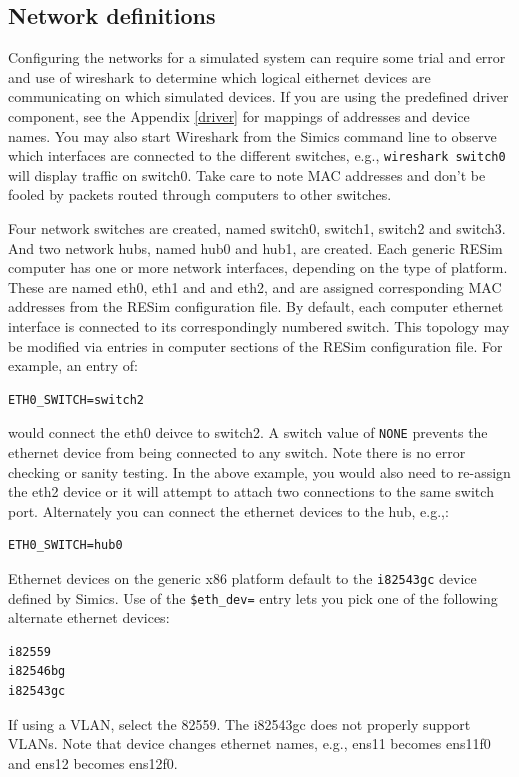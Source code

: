\documentclass[titlepage]{article}
\begin{document}
\subsection{Network definitions}
\label{networks}
Configuring the networks for a simulated system can require some trial and error and use of wireshark to determine which
logical eithernet devices are communicating on which simulated devices.  If you are using the predefined driver component, see the 
Appendix \ref{driver} for mappings of addresses and device names.  You may also start Wireshark from the Simics command line to 
observe which interfaces are connected to the different switches, e.g., {\tt wireshark switch0} will display traffic on switch0.
Take care to note MAC addresses and don't be fooled by packets routed through computers to other switches.

Four network switches are created, named switch0, switch1, switch2 and switch3. And two network hubs, named hub0 and hub1, are created.  
Each generic RESim computer has one or more network interfaces,
depending on the type of platform.
These are named eth0, eth1 and and eth2, and are assigned corresponding MAC addresses from the
RESim configuration file. By default, each computer ethernet interface is connected to its correspondingly numbered switch.
This topology may be modified via entries in computer sections of the RESim configuration file.  For example, an entry of:
\begin{verbatim}
ETH0_SWITCH=switch2
\end{verbatim}
\noindent would connect the eth0 deivce to switch2.  A switch value of {\tt NONE} prevents the ethernet device from being connected
to any switch.  Note there is no error checking or sanity testing.  In the above example, you would also need to re-assign the eth2 device
or it will attempt to attach two connections to the same switch port.
Alternately you can connect the ethernet devices to the hub, e.g.,:
\begin{verbatim}
ETH0_SWITCH=hub0
\end{verbatim}

Ethernet devices on the generic x86 platform default to the {\tt i82543gc} device defined by Simics.  Use of the {\tt \$eth\_dev=} 
entry lets you pick one of the following alternate ethernet devices:
\begin{verbatim}
i82559
i82546bg
i82543gc
\end{verbatim}

If using a VLAN, select the 82559.  The i82543gc does not properly support VLANs.
Note that device changes ethernet names, e.g., ens11 becomes ens11f0 and ens12 becomes ens12f0.
\end{document}
